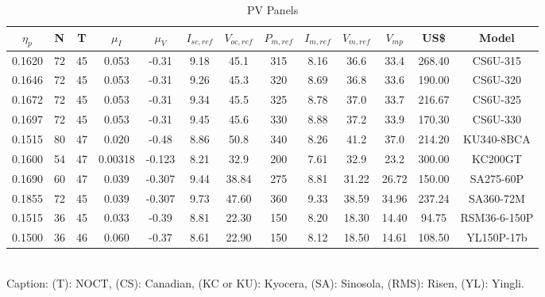 \begin{table}
\caption{PV Panels}\label{tab:panels}
\begin{scriptsize}
\begin{tabular}{|c|c|c|c|c|c|c|c|c|c|c|c|c|}
\hline
\hline
$\eta_{p}$ & N & T & $\mu_{I}$ & $\mu_{V}$ & $I_{sc,ref}$ & $V_{oc,ref}$ & $P_{m,ref}$ & $I_{m,ref}$ & $V_{m,ref}$ & $V_{mp}$ & US\$ & Model \\
\hline
\hline
0.1620 & 72 & 45 & 0.053 & -0.31 & 9.18 & 45.1 & 315 & 8.16 & 36.6 & 33.4 & 268.40 & CS6U-315 \\
\hline
0.1646 & 72 & 45 & 0.053 & -0.31 & 9.26 & 45.3 & 320 & 8.69 & 36.8 & 33.6 & 190.00 &  CS6U-320 \\
\hline
0.1672 & 72 & 45 & 0.053 & -0.31 & 9.34 & 45.5 & 325 & 8.78 & 37.0 & 33.7 & 216.67 & CS6U-325 \\
\hline
0.1697 & 72 & 45 & 0.053 & -0.31 & 9.45 & 45.6 & 330 & 8.88 & 37.2 & 33.9 & 170.30 & CS6U-330 \\
\hline
0.1515 & 80 & 47 & 0.020 & -0.48 & 8.86 & 50.8 & 340 & 8.26 & 41.2 & 37.0 & 214.20 & KU340-8BCA \\
\hline
0.1600 & 54 & 47 & 0.00318 & -0.123 & 8.21 & 32.9 & 200 & 7.61 & 32.9 & 23.2 & 300.00 & KC200GT \\
\hline
0.1690 & 60 & 47 & 0.039 & -0.307 & 9.44 & 38.84 & 275 & 8.81 & 31.22 & 26.72 & 150.00 & SA275-60P \\
\hline
0.1855 & 72 & 45 & 0.039 & -0.307 & 9.73 & 47.60 & 360 & 9.33 & 38.59 & 34.96 & 237.24 & SA360-72M \\
\hline
0.1515 & 36 & 45 & 0.033 & -0.39 & 8.81 & 22.30 & 150 & 8.20 & 18.30 & 14.40 & 94.75 & RSM36-6-150P \\
\hline
0.1500 & 36 & 46 & 0.060 & -0.37 & 8.61 & 22.90 & 150 & 8.12 & 18.50 & 14.61 & 108.50 & YL150P-17b \\
\hline
\hline
\end{tabular}
\\Caption: (T): NOCT, (CS): Canadian, (KC or KU): Kyocera, (SA): Sinosola, (RMS): Risen, (YL): Yingli.
\end{scriptsize}
\end{table}



